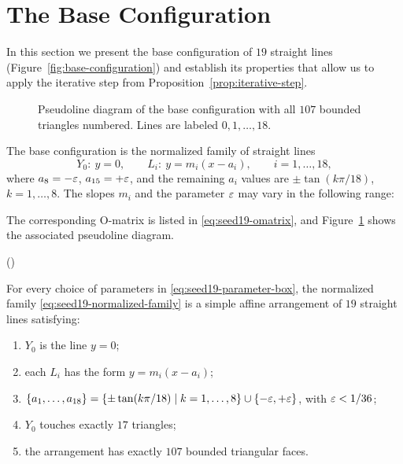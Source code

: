 \section{The Base Configuration}\label{sec:main-result}

In this section we present the base configuration of $19$ straight lines
(Figure~\ref{fig:base-configuration}) and establish its properties that allow us
to apply the iterative step from Proposition~\ref{prop:iterative-step}.

\begin{figure}[ht]
\centering
\resizebox{1.0\textwidth}{!}{}
\caption{Pseudoline diagram of the base configuration with all $107$
bounded triangles numbered. Lines are labeled $0,1,\dots,18$.}
\label{fig:pseudolines}
\end{figure}

The base configuration is the normalized family of straight lines
\begin{equation}\label{eq:seed19-normalized-family}
  Y_0:\ y=0,
  \qquad
  L_i:\ y=m_i(x-a_i),
  \qquad i=1,\dots,18,
\end{equation}
where $a_8=-\varepsilon$, $a_{15}=+\varepsilon$, and the remaining $a_i$ values are
$\pm\tan(k\pi/18)$, $k=1,\dots,8$. The slopes $m_i$ and the parameter $\varepsilon$
may vary in the following range:


The corresponding $\mathrm{O}$-matrix is listed in \eqref{eq:seed19-omatrix},
and Figure~\ref{fig:pseudolines} shows the associated pseudoline diagram.

\begingroup
\noindent\hfill
\begin{minipage}[c]{0.72\linewidth}
\footnotesize

\end{minipage}%
\hfill(\theequation)\label{eq:seed19-omatrix}
\endgroup

\begin{theorem}[Straight-line base configuration at $n=19$]\label{thm:main-seed}
For every choice of parameters in \eqref{eq:seed19-parameter-box},
the normalized family
\eqref{eq:seed19-normalized-family} is a simple affine arrangement of $19$
straight lines satisfying:
\begin{enumerate}[label=(\arabic*)]
\item $Y_0$ is the line $y=0$;
\item each $L_i$ has the form $y=m_i(x-a_i)$;
\item
$
  \{a_1,\dots,a_{18}\}
  =
  \{\pm\tan(k\pi/18)\mid k=1,\dots,8\}\cup\{-\varepsilon,+\varepsilon\}
$, with $\varepsilon<1/36$;
\item $Y_0$ touches exactly $17$ triangles;
\item the arrangement has exactly $107$ bounded triangular faces.
\end{enumerate}
\end{theorem}

